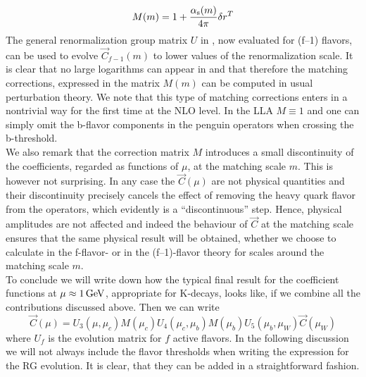 \begin{equation}\label{mdrt}  M(m)=1+{\alpha_{\rm s}(m)\over 4\pi} \delta r^T  \end{equation}
The general renormalization group matrix $U$ in , now
evaluated for (f--1) flavors, can be used to evolve $\vec C_{f-1}(m)$
to lower values of the renormalization scale. It is clear that no
large logarithms can appear in  and that therefore the
matching corrections, expressed in the matrix $M(m)$ can be
computed in usual perturbation theory. We note that this type of
matching corrections enters in a nontrivial way for the first time
at the NLO level. In the LLA $M\equiv 1$ and one can simply omit the
b-flavor components in the penguin operators when crossing the
b-threshold.\\
We also remark that the correction matrix $M$ introduces a small
discontinuity of the coefficients, regarded as functions of $\mu$,
at the matching scale $m$. This is however not surprising. In any
case the $\vec C(\mu)$ are not physical quantities and their
discontinuity precisely cancels the effect of removing the heavy
quark flavor from the operators, which evidently is a
``discontinuous'' step. Hence, physical amplitudes are not
affected and indeed the behaviour of $\vec C$ at the matching scale
ensures that the same physical result will be obtained,
whether we choose to calculate in the f-flavor- or in the (f--1)-flavor
theory for scales around the matching scale $m$.\\
To conclude we will write down how the typical final result for
the coefficient functions at $\mu\approx 1\, {\rm GeV}$, appropriate for
K-decays, looks like, if we combine all the contributions discussed
above. Then we can write
\begin{equation}\label{cthr}
\vec C(\mu)=U_3(\mu,\mu_c)M(\mu_c)U_4(\mu_c,\mu_b)M(\mu_b)
U_5(\mu_b,\mu_W)\vec C(\mu_W)  \end{equation}
where $U_f$ is the evolution matrix for $f$ active flavors.
In the following discussion we will not always include the flavor
thresholds when writing the expression for the RG evolution. It is
clear, that they can be added in a straightforward fashion.

